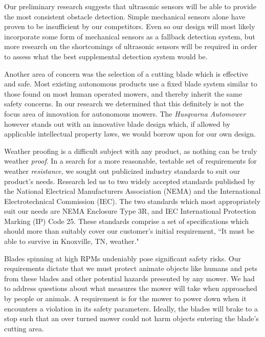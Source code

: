 \documentclass[12pt,letterpaper]{article}
\begin{document}
Our preliminary research suggests that ultrasonic sensors will be able to
provide the most consistent obstacle detection.  Simple mechanical sensors alone
have proven to be insufficient by our competitors. Even so our design will most
likely incorporate some form of mechanical sensors as a fallback detection
system, but more research on the shortcomings of ultrasonic sensors will be
required in order to assess what the best supplemental detection system would
be.

Another area of concern was the selection of a cutting blade which is effective
and safe.  Most existing autonomous products use a fixed blade system similar to
those found on most human operated mowers, and thereby inherit the same safety
concerns.  In our research we determined that this definitely is not the focus
area of innovation for autonomous mowers. The \textit{Husqvarna
Automower}\autocite{automower} however stands out with an innovative blade
design which, if allowed by applicable intellectual property laws, we would
borrow upon for our own design.

Weather proofing is a difficult subject with any product, as nothing can be
truly weather \textit{proof}.  In a search for a more reasonable, testable set
of requirements for weather \textit{resistance}, we sought out publicized
industry standards to suit our product's needs.  Research led us to two widely
accepted standards published by the National Electrical Manufacturers
Association (NEMA) and the International Electrotechnical Commission (IEC).  The
two standards which most appropriately suit our needs are NEMA Enclosure Type
3R\autocite{nema3r}, and IEC International Protection Marking (IP) Code
25.\autocite{ip25}  These standards comprise a set of specifications which
should more than suitably cover our customer's initial requirement, ``It must be
able to survive in Knoxville, TN, weather."

Blades spinning at high RPMs undeniably pose significant safety risks.  Our
requirements dictate that we must protect animate objects like humans and pets
from these blades and other potential hazards presented by any mower.  We had to
address questions about what measures the mower will take when approached by
people or animals.  A requirement is for the mower to power down when it
encounters a violation in its safety parameters.  Ideally, the blades will brake
to a stop such that an over turned mower could not harm objects entering the
blade's cutting area.
\end{document}
